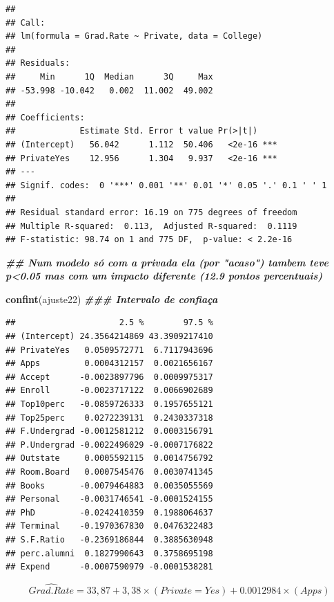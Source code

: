 \documentclass[
]{article}
\newenvironment{Shaded}{\begin{snugshade}}{\end{snugshade}}
\newcommand{\DocumentationTok}[1]{\textcolor[rgb]{0.56,0.35,0.01}{\textbf{\textit{#1}}}}
\newcommand{\FunctionTok}[1]{\textcolor[rgb]{0.13,0.29,0.53}{\textbf{#1}}}
\newcommand{\NormalTok}[1]{#1}
\begin{document}
\begin{verbatim}
## 
## Call:
## lm(formula = Grad.Rate ~ Private, data = College)
## 
## Residuals:
##     Min      1Q  Median      3Q     Max 
## -53.998 -10.042   0.002  11.002  49.002 
## 
## Coefficients:
##             Estimate Std. Error t value Pr(>|t|)    
## (Intercept)   56.042      1.112  50.406   <2e-16 ***
## PrivateYes    12.956      1.304   9.937   <2e-16 ***
## ---
## Signif. codes:  0 '***' 0.001 '**' 0.01 '*' 0.05 '.' 0.1 ' ' 1
## 
## Residual standard error: 16.19 on 775 degrees of freedom
## Multiple R-squared:  0.113,  Adjusted R-squared:  0.1119 
## F-statistic: 98.74 on 1 and 775 DF,  p-value: < 2.2e-16
\end{verbatim}

\begin{Shaded}
\begin{Highlighting}[]
\DocumentationTok{\#\# Num modelo só com a privada ela (por "acaso") tambem teve p\textless{}0.05 mas com um impacto diferente (12.9 pontos percentuais)}
\end{Highlighting}
\end{Shaded}

\begin{Shaded}
\begin{Highlighting}[]
\FunctionTok{confint}\NormalTok{(ajuste22) }\DocumentationTok{\#\#\# Intervalo de confiaça}
\end{Highlighting}
\end{Shaded}

\begin{verbatim}
##                     2.5 %        97.5 %
## (Intercept) 24.3564214869 43.3909217410
## PrivateYes   0.0509572771  6.7117943696
## Apps         0.0004312157  0.0021656167
## Accept      -0.0023897796  0.0009975317
## Enroll      -0.0023717122  0.0066902689
## Top10perc   -0.0859726333  0.1957655121
## Top25perc    0.0272239131  0.2430337318
## F.Undergrad -0.0012581212  0.0003156791
## P.Undergrad -0.0022496029 -0.0007176822
## Outstate     0.0005592115  0.0014756792
## Room.Board   0.0007545476  0.0030741345
## Books       -0.0079464883  0.0035055569
## Personal    -0.0031746541 -0.0001524155
## PhD         -0.0242410359  0.1988064637
## Terminal    -0.1970367830  0.0476322483
## S.F.Ratio   -0.2369186844  0.3885630948
## perc.alumni  0.1827990643  0.3758695198
## Expend      -0.0007590979 -0.0001538281
\end{verbatim}

\[
\hat{Grad.Rate} = 33,87 + 3,38 \times (Private = Yes) + 0.0012984 \times (Apps)
\]
\end{document}
